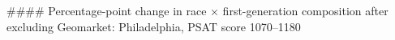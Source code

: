 #### Percentage-point change in race × first-generation composition after excluding Geomarket: Philadelphia, PSAT score 1070–1180
